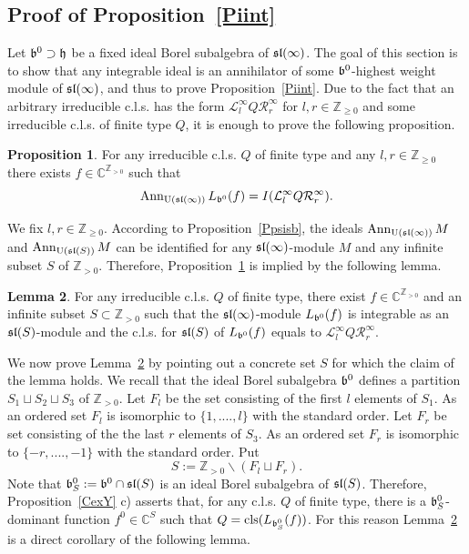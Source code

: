 \documentclass[10pt]{amsart}\oddsidemargin -1mm \evensidemargin -1mm \topmargin -15mm\headheight5mm \headsep 3.5mm \textheight 245mm\textwidth 170mm %
\theoremstyle{definition}\newtheorem{theorem}{Theorem}[section]\newtheorem{lemma}[theorem]{Lemma}\newtheorem{remark}[theorem]{Remark}\newtheorem{proposition}[theorem]{Proposition}\newtheorem{corollary}[theorem]{Corollary}\newtheorem{definition}[theorem]{Definition}\newtheorem{Ex}[theorem]{Example}
\begin{document}
\subsection{Proof of Proposition~\ref{Piint}}\label{SSiint}%
Let $\frak b^0\supset\frak h$ be a fixed ideal Borel subalgebra of $\frak{sl}(\infty)$. The goal of this section is to show that any integrable ideal is an
annihilator of some $\frak b^0$-highest weight module of $\frak{sl}(\infty)$, and thus to prove Proposition~\ref{Piint}. Due to the fact that an arbitrary irreducible c.l.s. has the form $\mathcal L^\infty_lQ\mathcal R^\infty_r$ for $l,r\in\mathbb Z_{\ge0}$ and some irreducible c.l.s. of finite type $Q$, it is enough to prove the following proposition.

\begin{proposition}\label{Pclsid}For any
irreducible c.l.s. $Q$ of finite type and any $l, r\in\mathbb Z_{\ge0}$ there
exists $f\in \mathbb C^{\mathbb Z_{>0}}$ such that $$\operatorname{\mathrm{Ann}}_{\operatorname{\mathrm{U}}(\frak{sl}(\infty))}L_{\frak b^0}(f)=I(\mathcal L^\infty_lQ\mathcal R^\infty_r).$$\end{proposition}
We fix $l, r\in\mathbb Z_{\ge0}$. According to Proposition~\ref{Ppsisb}, the ideals $\operatorname{\mathrm{Ann}}_{\operatorname{\mathrm{U}}(\frak{sl}(\infty))}M$ and $\operatorname{\mathrm{Ann}}_{\operatorname{\mathrm{U}}(\frak{sl}(S))}M$ can be identified for any $\frak{sl}(\infty)$-module $M$ and any infinite subset $S$ of $\mathbb Z_{>0}$. Therefore, Proposition~\ref{Pclsid} is implied by %
the following lemma.
\begin{lemma}\label{Lclsidg}For any irreducible
c.l.s. $Q$ of finite type, there exist $f\in \mathbb C^{\mathbb Z_{>0}}$ and
an infinite subset $S\subset\mathbb Z_{>0}$ such that the $\frak{sl}(\infty)$-module $L_{\frak b^0}(f)$ is integrable as
an $\frak{sl}(S)$-module and the c.l.s. for $\frak{sl}(S)$ of $L_{\frak b^0}(f)$ equals to $\mathcal L^\infty_lQ\mathcal R^\infty_r$.\end{lemma}
We now prove Lemma~\ref{Lclsidg} by pointing out a concrete set $S$ for which the claim of the lemma holds. We recall that the ideal Borel subalgebra $\frak b^0$ defines a partition $S_1\sqcup S_2\sqcup S_3$ of $\mathbb Z_{>0}$. Let $F_l$ be the set consisting of the first $l$ elements of $S_1$. As an ordered set $F_l$ is isomorphic to $\{1,...., l\}$ with the standard order. Let $F_r$ be set consisting of the the last $r$ elements of $S_3$. As an ordered set $F_r$ is isomorphic to $\{-r,...., -1\}$ with the standard order. Put $$S:=\mathbb Z_{>0}\backslash (F_l\sqcup F_r).$$
Note that $\frak b^0_S:=\frak b^0\cap\frak{sl}(S)$ is an ideal Borel subalgebra of $\frak{sl}(S)$. Therefore, Proposition~\ref{CexY} c) asserts that, for any c.l.s. $Q$ of finite type, there is a $\frak b^0_S$-dominant function $f^0\in \mathbb C^S$ such that $Q=\operatorname{\mathrm{cls}}(L_{\frak b^0_S}(f))$. For this reason Lemma~\ref{Lclsidg} is a direct corollary of the
following lemma.
\end{document}
